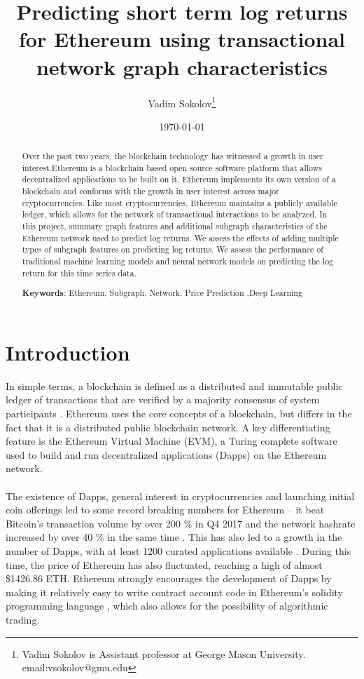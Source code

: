 \documentclass[12pt]{article}%
\title{Predicting short term log returns for Ethereum using transactional network graph characteristics}
\author{
Vadim Sokolov\thanks{Vadim Sokolov is Assistant professor at George Mason University. email:vsokolov@gmu.edu}}
\date{\today}
\begin{document}
\maketitle
\begin{abstract}


Over the past two years, the blockchain technology has witnessed a growth in user interest.Ethereum is a blockchain based open source software platform that allows decentralized applications to be built on it.  Ethereum implements its own version of a blockchain and conforms with the growth in user interest across major cryptocurrencies. Like most cryptocurrencies, Ethereum maintains a publicly available ledger, which allows for the network of transactional interactions to be analyzed. In this project, summary graph features and additional subgraph characteristics of the Ethereum network used to predict log returns. We assess the effects of adding multiple types of subgraph features on predicting log returns. We assess the performance of traditional machine learning models and neural network models on predicting the log return for this time series data. 
\noindent 


\vspace{0.1in} 
\noindent \textbf{Keywords}: Ethereum, Subgraph, Network, Price Prediction  ,Deep Learning
\end{abstract}

\newpage

\section{Introduction}

In simple terms, a blockchain is defined as a distributed and immutable public ledger of transactions that are verified by a majority consensus of system participants \cite{1}. Ethereum uses the core concepts of a blockchain, but differs in the fact that it is a distributed public blockchain network. A key differentiating feature is the Ethereum Virtual Machine (EVM), a Turing complete software used to build and run decentralized applications (Dapps) on the Ethereum network.

\paragraph{}The existence of Dapps, general interest in cryptocurrencies and launching initial coin offerings led to some record breaking numbers for Ethereum – it beat Bitcoin’s transaction volume by over 200 \% in Q4 2017 and the network hashrate increased by over 40 \% in the same time \cite{2}. This has also led to a growth in the number of Dapps, with at least 1200 curated applications available \cite{3}. During this time, the price of Ethereum has also fluctuated, reaching a high of almost \$1426.86 ETH. Ethereum strongly encourages the development of Dapps by making it relatively easy to write contract account code in Ethereum’s solidity programming language \cite{28}, which also allows for the possibility of algorithmic trading.
\end{document}
